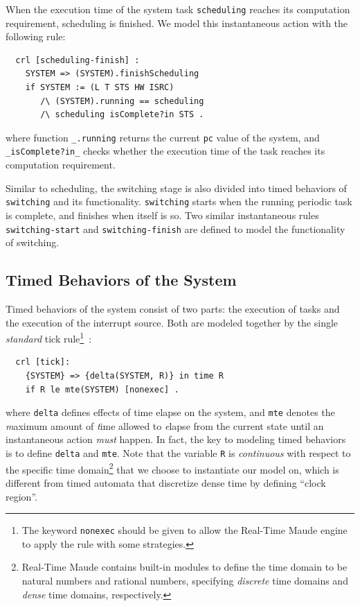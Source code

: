 \documentclass[journal]{IEEEtranTIE}
\begin{document}
When the execution time of the system task \verb|scheduling| reaches
its computation requirement, scheduling is finished. We model this
instantaneous action with the following rule:
\begin{verbatim}
  crl [scheduling-finish] :
    SYSTEM => (SYSTEM).finishScheduling
    if SYSTEM := (L T STS HW ISRC) 
       /\ (SYSTEM).running == scheduling 
       /\ scheduling isComplete?in STS .
\end{verbatim}
where function \verb|_.running| returns the current \verb|pc| value of
the system, and \verb|_isComplete?in_| checks whether the execution
time of the task reaches its computation requirement.  

Similar to scheduling, the switching stage is also divided into timed
behaviors of \verb|switching| and its functionality. \verb|switching|
starts when the running periodic task is complete, and finishes when
itself is so. Two similar instantaneous rules \verb|switching-start|
and \verb|switching-finish| are defined to model the functionality of
switching. 


\subsection{Timed Behaviors of the System}
\label{ss:timedbehavior}
Timed behaviors of the system consist of two parts: the execution of
tasks and the execution of the interrupt source. Both are modeled
together by the  single \emph{standard} tick
rule\footnote{The keyword \texttt{nonexec} should be given to allow
  the Real-Time Maude engine to apply the rule with some
  strategies.}~\cite{DBLP:journals/entcs/OlveczkyM07a}:
\begin{verbatim}
  crl [tick]:
    {SYSTEM} => {delta(SYSTEM, R)} in time R 
    if R le mte(SYSTEM) [nonexec] .
\end{verbatim}
where \verb|delta| defines effects of time elapse on the system, and
\verb|mte| denotes the \emph{m}aximum amount of \emph{t}ime allowed to
\emph{e}lapse from the current state until an instantaneous action
\emph{must} happen. In fact, the key to modeling timed behaviors is to
define \verb|delta| and \verb|mte|. Note that the variable \verb|R| is
\emph{continuous} with respect to the specific time
domain\footnote{Real-Time Maude contains built-in modules to define
  the time domain to be natural numbers and rational numbers,
  specifying \emph{discrete} time domains and \emph{dense} time
  domains, respectively.}  that we choose to instantiate our model on,
which is different from timed automata that discretize dense time by
defining ``clock region''.
\end{document}
